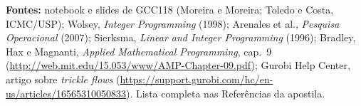 \documentclass[10pt,a4paper]{article}
\begin{document}
\vspace{-4pt}
{\footnotesize\textbf{Fontes:} notebook e slides de GCC118 (Moreira e Moreira; Toledo e Costa, ICMC/USP);
Wolsey, \emph{Integer Programming} (1998); Arenales et al., \emph{Pesquisa Operacional} (2007); Sierksma,
\emph{Linear and Integer Programming} (1996); Bradley, Hax e Magnanti, \emph{Applied Mathematical Programming},
cap.~9 (\url{http://web.mit.edu/15.053/www/AMP-Chapter-09.pdf}); Gurobi Help Center, artigo sobre
\emph{trickle flows} (\url{https://support.gurobi.com/hc/en-us/articles/16565310050833}). Lista completa nas
Referências da apostila.\par}
\end{document}
